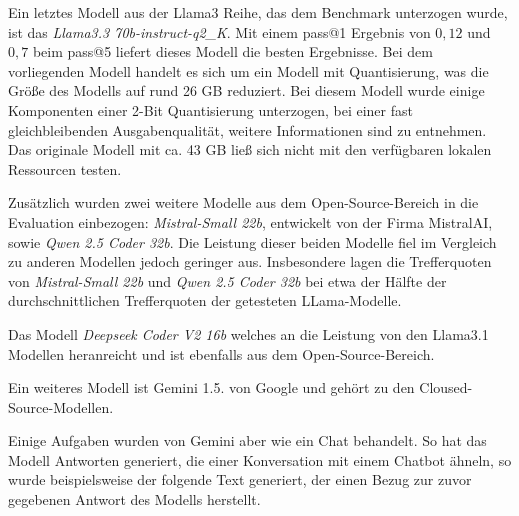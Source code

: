 Ein letztes Modell aus der Llama3 Reihe, das dem Benchmark unterzogen wurde, ist das \textit{Llama3.3 70b-instruct-q2\_K}. Mit einem pass@1 Ergebnis von $0,12$ und $0,7$ beim pass@5 liefert dieses Modell die besten Ergebnisse. Bei dem vorliegenden Modell handelt es sich um ein Modell mit Quantisierung, was die Größe des Modells auf rund 26 GB reduziert.
Bei diesem Modell wurde einige Komponenten einer 2-Bit Quantisierung unterzogen, bei einer fast gleichbleibenden Ausgabenqualität, weitere Informationen sind \cite{hugging-face-2025} zu entnehmen. Das originale Modell mit ca. 43 GB ließ sich nicht mit den verfügbaren lokalen Ressourcen testen.\vspace{0.2cm}

Zusätzlich wurden zwei weitere Modelle aus dem Open-Source-Bereich in die Evaluation einbezogen: \textit{Mistral-Small 22b}, entwickelt von der Firma MistralAI, sowie \textit{Qwen 2.5 Coder 32b}. Die Leistung dieser beiden Modelle fiel im Vergleich zu anderen Modellen jedoch geringer aus. Insbesondere lagen die Trefferquoten von \textit{Mistral-Small 22b} und \textit{Qwen 2.5 Coder 32b} bei etwa der Hälfte der durchschnittlichen Trefferquoten der getesteten LLama-Modelle.\vspace{0.2cm}

Das Modell \textit{Deepseek Coder V2 16b} welches an die Leistung von den Llama3.1 Modellen heranreicht und ist ebenfalls aus dem Open-Source-Bereich.\vspace{0.2cm}


Ein weiteres Modell ist Gemini 1.5. von Google und gehört zu den Cloused-Source-Modellen. 

Einige Aufgaben wurden von Gemini aber wie ein Chat behandelt. So hat das Modell Antworten generiert, die einer Konversation mit einem Chatbot ähneln, so wurde beispielsweise der folgende Text generiert, der einen Bezug zur zuvor gegebenen Antwort des Modells herstellt.

